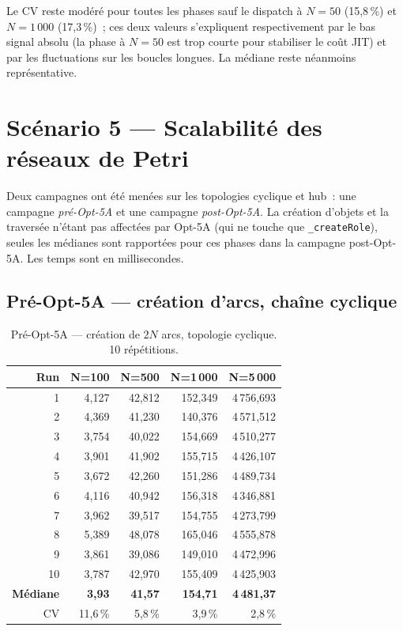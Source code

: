 Le CV reste modéré pour toutes les phases sauf le dispatch à $N=50$
(15,8\,\%) et $N=1\,000$ (17,3\,\%)~; ces deux valeurs s'expliquent
respectivement par le bas signal absolu (la phase à $N=50$ est trop
courte pour stabiliser le coût JIT) et par les fluctuations sur les
boucles longues. La médiane reste néanmoins représentative.

\section{Scénario 5 — Scalabilité des réseaux de Petri}
\label{ann:mesures-s5}

Deux campagnes ont été menées sur les topologies cyclique et hub~: une
campagne \emph{pré-Opt-5A} et une campagne \emph{post-Opt-5A}. La création d'objets et la traversée
n'étant pas affectées par Opt-5A (qui ne touche que
\texttt{\_createRole}), seules les médianes sont rapportées pour ces
phases dans la campagne post-Opt-5A. Les temps sont en millisecondes.

\subsection*{Pré-Opt-5A --- création d'arcs, chaîne cyclique}

\begin{table}[h]
\centering
\caption{Pré-Opt-5A --- création de $2N$ arcs, topologie cyclique.
10 répétitions.}
\begin{tabular}{rrrrr}
\hline
\textbf{Run} & \textbf{N=100} & \textbf{N=500} & \textbf{N=1\,000} & \textbf{N=5\,000} \\
\hline
1  & 4,127 & 42,812 & 152,349 & 4\,756,693 \\
2  & 4,369 & 41,230 & 140,376 & 4\,571,512 \\
3  & 3,754 & 40,022 & 154,669 & 4\,510,277 \\
4  & 3,901 & 41,902 & 155,715 & 4\,426,107 \\
5  & 3,672 & 42,260 & 151,286 & 4\,489,734 \\
6  & 4,116 & 40,942 & 156,318 & 4\,346,881 \\
7  & 3,962 & 39,517 & 154,755 & 4\,273,799 \\
8  & 5,389 & 48,078 & 165,046 & 4\,555,878 \\
9  & 3,861 & 39,086 & 149,010 & 4\,472,996 \\
10 & 3,787 & 42,970 & 155,409 & 4\,425,903 \\
\hline
\textbf{Médiane} & \textbf{3,93} & \textbf{41,57} & \textbf{154,71} & \textbf{4\,481,37} \\
CV               & 11,6\,\%      & 5,8\,\%        & 3,9\,\%         & 2,8\,\% \\
\hline
\end{tabular}
\end{table}


